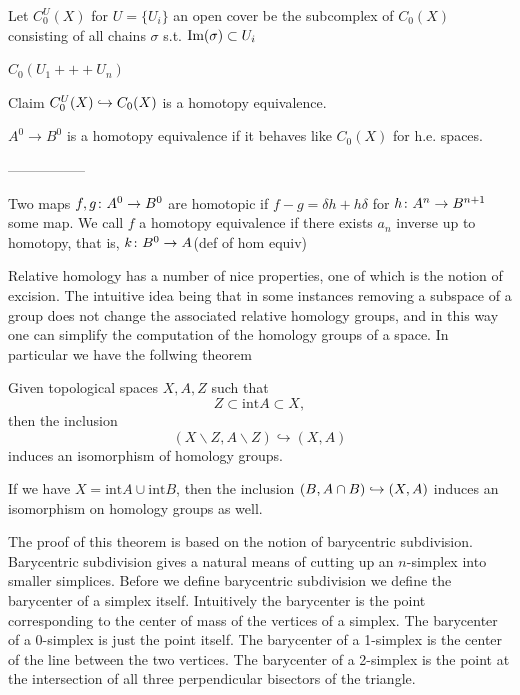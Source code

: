 \documentclass[11pt,leqno,oneside]{amsart}
\newenvironment{dateenv}{
  \vspace{1em}
}{
  \vspace{1em}
}
\newcommand{\mydate}[4]{
  \newdate{#1}{#2}{#3}{#4}
  \begin{dateenv}
    \hfill\displaydate{#1}
  \end{dateenv}
}
\numberwithin{thm}{section}
\renewcommand{\setminus}{\smallsetminus}
\begin{document}
Let $C^U_0(X)$ for $U = \{U_i\}$ an open cover be the subcomplex of $C_0(X)$ consisting of all chains $\sigma$ s.t. $\text{Im}(\sigma) \subset U_i$

$C_0(U_1 +++ U_n)$

Claim $C^U_0(X) \hookrightarrow C_0(X)$ is a homotopy equivalence.

$A^0 \to B^0$ is a homotopy equivalence if it behaves like $C_0(X)$ for h.e. spaces.

-----------------

Two maps $f,g \colon A^0 \to B^0$ are homotopic if $f - g = \delta h + h \delta$ for $h \colon A^n \to B^{n+1}$ some map.  We call $f$ a homotopy equivalence if there exists $a_n$ inverse up to homotopy, that is, $k \colon B^0 \to A$(def of hom equiv)




\mydate{d21}{22}{3}{2017}

Relative homology has a number of nice properties, one of which is the notion of excision. The intuitive idea being that in some instances removing a subspace of a group does not change the associated relative homology groups, and in this way one can simplify the computation of the homology groups of a space. In particular we have the follwing theorem

\begin{thm}[Excision]

  Given topological spaces \(X,A,Z\) such that
  \[Z \subset \text{int}{A} \subset X,\]
  then the inclusion
  \[(X \setminus Z,A \setminus Z) \hookrightarrow (X,A) \]
  induces an isomorphism of homology groups. 
\end{thm}

If we have \(X=\text{int} A \cup \text{int} B\), then the inclusion \((B, A \cap B) \hookrightarrow (X,A)\) induces an isomorphism on homology groups as well.

The proof of this theorem is based on the notion of barycentric subdivision. Barycentric subdivision gives a natural means of cutting up an \(n\)-simplex into smaller simplices. Before we define barycentric subdivision we define the barycenter of a simplex itself. Intuitively the barycenter is the point corresponding to the center of mass of the vertices of a simplex. The barycenter of a 0-simplex is just the point itself. The barycenter of a 1-simplex is the center of the line between the two vertices. The barycenter of a 2-simplex is the point at the intersection of all three perpendicular bisectors of the triangle. 

\mydate{d22}{24}{3}{2017}
\end{document}
